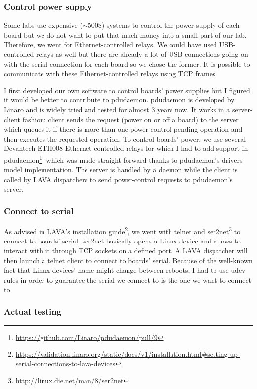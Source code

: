 \subsubsection{Control power supply}

Some labs use expensive ($\sim$500\$) systems to control the power supply of each board but we do not want to put that much money into a small part of our lab. Therefore, we went for Ethernet-controlled relays. We could have used USB-controlled relays as well but there are already a lot of USB connections going on with the serial connection for each board so we chose the former. It is possible to communicate with these Ethernet-controlled relays using TCP frames.

I first developed our own software to control boards' power supplies but I figured it would be better to contribute to pdudaemon. pdudaemon is developed by Linaro and is widely tried and tested for almost 3 years now. It works in a server-client fashion: client sends the request (power on or off a board) to the server which queues it if there is more than one power-control pending operation and then executes the requested operation. To control boards' power, we use several Devantech ETH008 Ethernet-controlled relays for which I had to add support in pdudaemon\footnote{\url{https://github.com/Linaro/pdudaemon/pull/9}}, which was made straight-forward thanks to pdudaemon's drivers model implementation. The server is handled by a daemon while the client is called by LAVA dispatchers to send power-control requests to pdudaemon's server.

\subsubsection{Connect to serial}

As advised in LAVA's installation guide\footnote{\url{https://validation.linaro.org/static/docs/v1/installation.html\#setting-up-serial-connections-to-lava-devices}}, we went with telnet and ser2net\footnote{\url{http://linux.die.net/man/8/ser2net}} to connect to boards' serial. ser2net basically opens a Linux device and allows to interact with it through TCP sockets on a defined port. A LAVA dispatcher will then launch a telnet client to connect to boards' serial. Because of the well-known fact that Linux devices' name might change between reboots, I had to use udev rules in order to guarantee the serial we connect to is the one we want to connect to.

\subsubsection{Actual testing}

